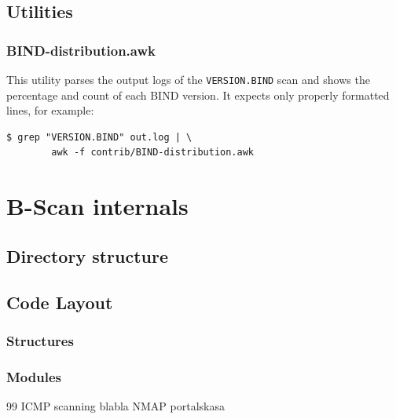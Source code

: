 \documentclass[11pt,a4paper,twoside]{article}
\begin{document}
\subsection{Utilities}
\subsubsection{BIND-distribution.awk}
This utility parses the output logs of the {\tt VERSION.BIND} scan and shows
the percentage and count of each BIND version. It expects only properly
formatted lines, for example:

\begin{verbatim}
$ grep "VERSION.BIND" out.log | \
        awk -f contrib/BIND-distribution.awk
\end{verbatim}

\section{B-Scan internals}
\subsection{Directory structure}
\subsection{Code Layout}
\subsubsection{Structures}
\subsubsection{Modules}

\label{references}
\begin{thebibliography}{99}
 ICMP scanning blabla
 NMAP portalskasa
\end{thebibliography}
\end{document}
